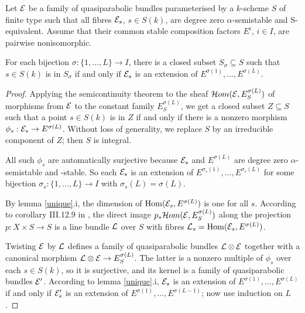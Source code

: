 \documentclass{article}
\begin{document}
\begin{prop} \label{closed}
  Let $\mathcal{E}$ be a family of quasiparabolic bundles parameterised by a $k$-scheme $S$ of finite type such that all fibres $\mathcal{E}_s$, $s \in S(k)$, are
  degree zero $\alpha$-semistable and S-equivalent. Assume that their common stable composition factors $E^i$, $i \in I$, are pairwise nonisomorphic.

  For each bijection $\sigma: \{1, \ldots, L\} \to I$, there is a closed subset $S_{\sigma} \subseteq S$ such that $s \in S(k)$ is in $S_{\sigma}$ if
  and only if $\mathcal{E}_s$ is an extension of $E^{\sigma(1)}, \ldots, E^{\sigma(L)}$.
\end{prop}
\begin{proof}
  Applying the semicontinuity theorem to the sheaf $\mathcal{H}om( \mathcal{E}, E^{\sigma(L)}_S)$ of morphisms from $\mathcal{E}$ to the constant family $E^{\sigma(L)}_S$,
  we get a closed subset $Z \subseteq S$ such that a point $s \in S(k)$ is in $Z$ if and only if there is a nonzero morphism $\phi_s: \mathcal{E}_s \to
  E^{\sigma(L)}$. Without loss of generality, we replace $S$ by an irreducible component of $Z$; then $S$ is integral.

  All such $\phi_s$ are automatically surjective because $\mathcal{E}_s$ and $E^{\sigma(L)}$ are degree zero $\alpha$-semistable and -stable. So each $\mathcal{E}_s$ is
  an extension of $E^{\sigma_s(1)}, \ldots, E^{\sigma_s(L)}$ for some bijection $\sigma_s: \{1, \ldots, L\} \to I$ with $\sigma_s(L) = \sigma(L)$.

  By lemma \ref{unique}.i, the dimension of $\mathrm{Hom}( \mathcal{E}_s, E^{\sigma(L)})$ is one for all $s$. According to corollary III.12.9 in \cite{hartshorne}, the
  direct image $p_* \mathcal{H}om( \mathcal{E}, E^{ \sigma(L)}_S)$ along the projection $p: X \times S \to S$ is a line bundle $\mathcal{L}$ over $S$ with fibres
  $\mathcal{L}_s = \mathrm{Hom}(\mathcal{E}_s, E^{\sigma(L)})$.

  Twisting $\mathcal{E}$ by $\mathcal{L}$ defines a family of quasiparabolic bundles $\mathcal{L} \otimes \mathcal{E}$ together with a canonical morphism $\mathcal{L} \otimes \mathcal{E} \to E^{\sigma(L)}_S$.
  The latter is a nonzero multiple of $\phi_s$ over each $s \in S(k)$, so it is surjective, and its kernel is a family of quasiparabolic bundles $\mathcal{E}'$.
  According to lemma \ref{unique}.i, $\mathcal{E}_s$ is an extension of $E^{\sigma(1)}, \ldots, E^{\sigma(L)}$ if and only if $\mathcal{E}_s'$ is an extension of
  $E^{\sigma(1)}, \ldots, E^{\sigma(L-1)}$; now use induction on $L$.
\end{proof}
\end{document}
